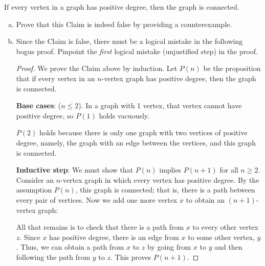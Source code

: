 \documentclass[12pt]{article}
\newcommand{\mfigure}[3]{\bigskip\centerline{\resizebox{#1}{#2}{\texttt{[image: \#3]}}}\bigskip}
\begin{document}
\begin{falseclm*}
If every vertex in a graph has positive degree, then the graph is
connected.
\end{falseclm*}

\begin{enumerate}[(a)]

\item Prove that this Claim is indeed false by providing a
counterexample.


\item Since the Claim is false, there must be a logical mistake in the
following bogus proof.  Pinpoint the \emph{first} logical mistake
(unjustified step) in the proof.

\begin{proof}
  We prove the Claim above by induction.  Let $P(n)$ be the proposition
  that if every vertex in an $n$-vertex graph has positive degree, then
  the graph is connected.

\textbf{Base cases}: ($n \leq 2$).  In a graph with 1 vertex, that vertex
cannot have positive degree, so $P(1)$ holds vacuously.

$P(2)$ holds because there is only one graph with two vertices of positive
degree, namely, the graph with an edge between the vertices, and this
graph is connected.

\textbf{Inductive step}: We must show that $P(n)$ implies
$P(n+1)$ for all $n \geq 2$.  Consider an $n$-vertex graph in which every
vertex has positive degree.  By the assumption $P(n)$, this graph is
connected; that is, there is a path between every pair of vertices.  Now
we add one more vertex $x$ to obtain an $(n+1)$-vertex graph:

\mfigure{!}{1.75in}{false-connect-pic}

All that remains is to check that there is a path from $x$ to every other
vertex $z$.  Since $x$ has positive degree, there is an edge from $x$ to
some other vertex, $y$.  Thus, we can obtain a path from $x$ to $z$
by going from $x$ to $y$ and then following the path from $y$ to $z$.  This
proves $P(n+1)$.


\end{proof}
\end{enumerate}
\end{document}
